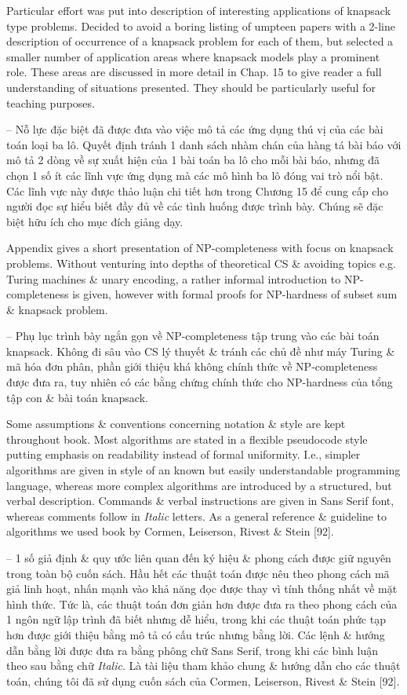 \documentclass{article}
\begin{document}
\begin{itemize}
    Particular effort was put into description of interesting applications of knapsack type problems. Decided to avoid a boring listing of umpteen papers with a 2-line description of occurrence of a knapsack problem for each of them, but selected a smaller number of application areas where knapsack models play a prominent role. These areas are discussed in more detail in Chap. 15 to give reader a full understanding of situations presented. They should be particularly useful for teaching purposes.

    -- Nỗ lực đặc biệt đã được đưa vào việc mô tả các ứng dụng thú vị của các bài toán loại ba lô. Quyết định tránh 1 danh sách nhàm chán của hàng tá bài báo với mô tả 2 dòng về sự xuất hiện của 1 bài toán ba lô cho mỗi bài báo, nhưng đã chọn 1 số ít các lĩnh vực ứng dụng mà các mô hình ba lô đóng vai trò nổi bật. Các lĩnh vực này được thảo luận chi tiết hơn trong Chương 15 để cung cấp cho người đọc sự hiểu biết đầy đủ về các tình huống được trình bày. Chúng sẽ đặc biệt hữu ích cho mục đích giảng dạy.

    Appendix gives a short presentation of NP-completeness with focus on knapsack problems. Without venturing into depths of theoretical CS \& avoiding topics e.g. Turing machines \& unary encoding, a rather informal introduction to NP-completeness is given, however with formal proofs for NP-hardness of subset sum \& knapsack problem.

    -- Phụ lục trình bày ngắn gọn về NP-completeness tập trung vào các bài toán knapsack. Không đi sâu vào CS lý thuyết \& tránh các chủ đề như máy Turing \& mã hóa đơn phân, phần giới thiệu khá không chính thức về NP-completeness được đưa ra, tuy nhiên có các bằng chứng chính thức cho NP-hardness của tổng tập con \& bài toán knapsack.

    Some assumptions \& conventions concerning notation \& style are kept throughout book. Most algorithms are stated in a flexible pseudocode style putting emphasis on readability instead of formal uniformity. I.e., simpler algorithms are given in style of an known but easily understandable programming language, whereas more complex algorithms are introduced by a structured, but verbal description. Commands \& verbal instructions are given in {\sf Sans Serif} font, whereas comments follow in {\it Italic} letters. As a general reference \& guideline to algorithms we used book by Cormen, Leiserson, Rivest \& Stein [92].

    -- 1 số giả định \& quy ước liên quan đến ký hiệu \& phong cách được giữ nguyên trong toàn bộ cuốn sách. Hầu hết các thuật toán được nêu theo phong cách mã giả linh hoạt, nhấn mạnh vào khả năng đọc được thay vì tính thống nhất về mặt hình thức. Tức là, các thuật toán đơn giản hơn được đưa ra theo phong cách của 1 ngôn ngữ lập trình đã biết nhưng dễ hiểu, trong khi các thuật toán phức tạp hơn được giới thiệu bằng mô tả có cấu trúc nhưng bằng lời. Các lệnh \& hướng dẫn bằng lời được đưa ra bằng phông chữ {\sf Sans Serif}, trong khi các bình luận theo sau bằng chữ {\it Italic}. Là tài liệu tham khảo chung \& hướng dẫn cho các thuật toán, chúng tôi đã sử dụng cuốn sách của Cormen, Leiserson, Rivest \& Stein [92].


\end{itemize}
\end{document}

